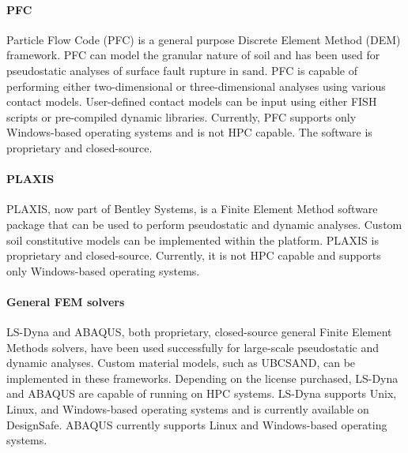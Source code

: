 \paragraph{PFC}
Particle Flow Code (PFC) is a general purpose Discrete Element Method (DEM) framework. PFC can model the granular nature of soil and has been used for pseudostatic analyses of surface fault rupture in sand. PFC is capable of performing either two-dimensional or three-dimensional analyses using various contact models. User-defined contact models can be input using either FISH scripts or pre-compiled dynamic libraries. Currently, PFC supports only Windows-based operating systems and is not HPC capable. The software is proprietary and closed-source.

\paragraph{PLAXIS}
PLAXIS, now part of Bentley Systems, is a Finite Element Method software package that can be used to perform pseudostatic and dynamic analyses. Custom soil constitutive models can be implemented within the platform. PLAXIS is proprietary and closed-source. Currently, it is not HPC capable and supports only Windows-based operating systems.

\paragraph{General FEM solvers}
LS-Dyna and ABAQUS, both proprietary, closed-source general Finite Element Methods solvers, have been used successfully for large-scale pseudostatic and dynamic analyses. Custom material models, such as UBCSAND, can be implemented in these frameworks. Depending on the license purchased, LS-Dyna and ABAQUS are capable of running on HPC systems. LS-Dyna supports Unix, Linux, and Windows-based operating systems and is currently available on DesignSafe. ABAQUS currently supports Linux and Windows-based operating systems.



